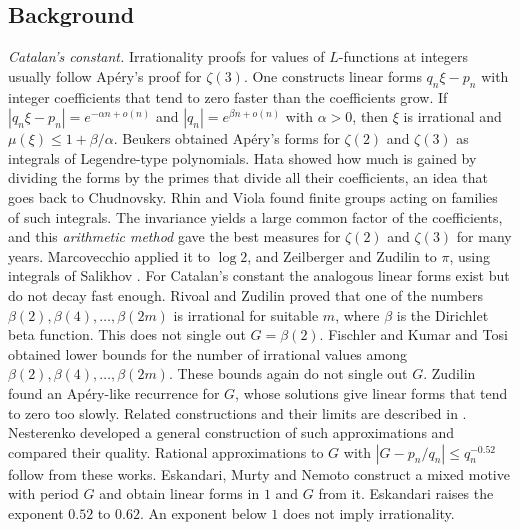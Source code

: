 \documentclass[11pt]{amsart}
\theoremstyle{definition}
\theoremstyle{remark}
\numberwithin{equation}{section}
\begin{document}
\subsection{Background}
\emph{Catalan's constant.} Irrationality proofs for values of $L$-functions at integers usually follow
Ap\'ery's proof for $\zeta(3)$. One constructs linear forms $q_n\xi-p_n$ with integer coefficients that
tend to zero faster than the coefficients grow. If $|q_n\xi-p_n|=e^{-\alpha n+o(n)}$ and
$|q_n|=e^{\beta n+o(n)}$ with $\alpha>0$, then $\xi$ is irrational and $\mu(\xi)\le1+\beta/\alpha$.
Beukers \cite{Beukers79} obtained Ap\'ery's forms for $\zeta(2)$ and $\zeta(3)$ as integrals of
Legendre-type polynomials. Hata \cite{Hata93} showed how much is gained by dividing the forms by the
primes that divide all their coefficients, an idea that goes back to Chudnovsky. Rhin and Viola
\cite{RhinViola96,RhinViola01} found finite groups acting on families of such integrals. The invariance
yields a large common factor of the coefficients, and this \emph{arithmetic method} gave the best
measures for $\zeta(2)$ and $\zeta(3)$ for many years. Marcovecchio \cite{Marcovecchio09} applied it to
$\log2$, and Zeilberger and Zudilin \cite{ZeilbergerZudilin20} to $\pi$, using integrals of Salikhov
\cite{Salikhov08}. For Catalan's constant the analogous linear forms exist but do not decay fast enough.
Rivoal and Zudilin \cite{RivoalZudilin2003} proved that one of the numbers $\beta(2),\beta(4),\ldots,\beta(2m)$
is irrational for suitable $m$, where $\beta$ is the Dirichlet beta function. This does not single out
$G=\beta(2)$. Fischler \cite{Fischler20} and Kumar and Tosi \cite{KumarTosi26} obtained lower bounds for the number of
irrational values among $\beta(2),\beta(4),\ldots,\beta(2m)$. These bounds again do not single out $G$.
Zudilin \cite{Zudilin2003} found an Ap\'ery-like recurrence for $G$, whose solutions give
linear forms that tend to zero too slowly. Related constructions and their limits are described in
\cite{Zudilin02Cheb,Rivoal06,KrattRivoal08,KrattZudilin19,Zudilin19Survey}. Nesterenko \cite{Nesterenko16} developed a
general construction of such approximations and compared their quality. Rational approximations to $G$ with
$|G-p_n/q_n|\le q_n^{-0.52}$ follow from these works. Eskandari, Murty and Nemoto \cite{EMN2025} construct a mixed motive
with period $G$ and obtain linear forms in $1$ and $G$ from it. Eskandari \cite{Eskandari2026} raises the exponent $0.52$
to $0.62$. An exponent below $1$ does not imply irrationality.
\end{document}
